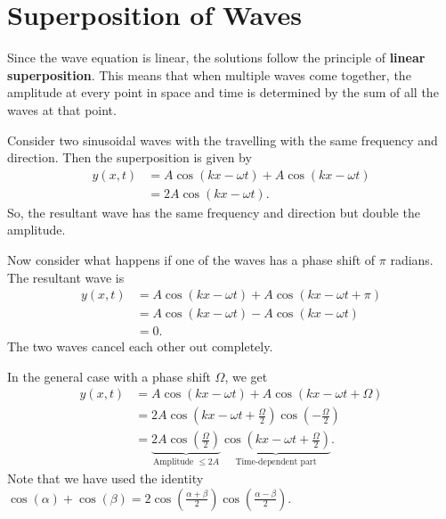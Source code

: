 \documentclass[../classical_mechanics.tex]{subfiles}
\begin{document}
    \section{Superposition of Waves}\label{sec:superposition-of-waves}
        Since the wave equation is linear, the solutions follow the principle of \textbf{linear superposition}.
        This means that when multiple waves come together, the amplitude at every point in space and time is determined by the sum of all the waves at that point.
        \begin{example}
            Consider two sinusoidal waves with the travelling with the same frequency and direction.
            Then the superposition is given by
            \begin{align}
                y(x,t)&=A\cos(kx-\omega t)+A\cos(kx-\omega t)\\
                &=2A\cos(kx-\omega t).
            \end{align}
            So, the resultant wave has the same frequency and direction but double the amplitude.

            Now consider what happens if one of the waves has a phase shift of $\pi$ radians.
            The resultant wave is
            \begin{align}
                y(x,t)&=A\cos(kx-\omega t)+A\cos(kx-\omega t+\pi)\\
                &=A\cos(kx-\omega t)-A\cos(kx-\omega t)\\
                &=0.
            \end{align}
            The two waves cancel each other out completely.

            In the general case with a phase shift $\Omega$, we get
            \begin{align}
                y(x,t)&=A\cos(kx-\omega t)+A\cos(kx-\omega t+\Omega)\\
                &=2A\cos\left(kx-\omega t+\frac{\Omega}{2}\right)\cos\left(-\frac{\Omega}{2}\right)\\
                &=\underbrace{2A\cos\left(\frac{\Omega}{2}\right)}_{\text{Amplitude }\leq 2A}\underbrace{\cos\left(kx-\omega t+\frac{\Omega}{2}\right)}_{\text{Time-dependent part}}.
            \end{align}
            Note that we have used the identity $\cos(\alpha)+\cos(\beta)=2\cos\left(\frac{\alpha+\beta}{2}\right)\cos\left(\frac{\alpha-\beta}{2}\right)$.
        \end{example}
\end{document}
